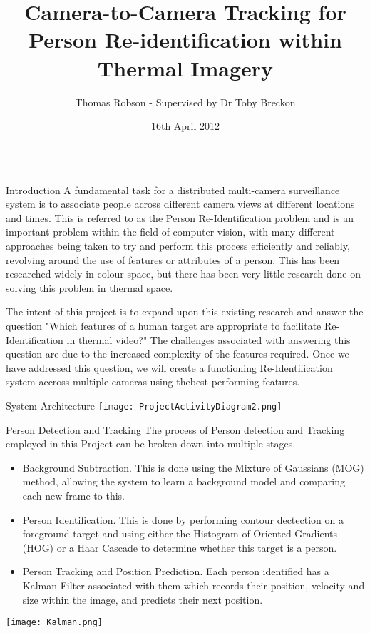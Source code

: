 \documentclass[final]{beamer}
\title[Thermal Re-ID]{Camera-to-Camera Tracking for Person Re-identification within Thermal Imagery}
\author[G Ingram]{Thomas Robson - Supervised by Dr Toby Breckon}
\institute[Durham]{School of Engineering and Computing Sciences, Durham University}
\date{16th April 2012}
\begin{document}
  \begin{frame}{} 

  \vfill
    \begin{columns}[t]
      \begin{column}{.48\linewidth}
        \begin{block}{Introduction}
          A fundamental task for a distributed multi-camera surveillance system is to associate people across different camera views at different locations and times. This is referred to as the Person Re-Identification problem and is an important problem within the field of computer vision, with many different approaches being taken to try and perform this process efficiently and reliably, revolving around the use of features or attributes of a person. This has been researched widely in colour space, but there has been very little research done on solving this problem in thermal space. 

The intent of this project is to expand upon this existing research and answer the question "Which features of a human target are appropriate to facilitate Re-Identification in thermal video?" The challenges associated with answering this question are due to the increased complexity of the features required. Once we have addressed this question, we will create a functioning Re-Identification system accross multiple cameras using thebest performing features.
        \end{block}

       

        \begin{block}{System Architecture}
          \texttt{[image: ProjectActivityDiagram2.png]}  
          \centering
        \end{block}
        
        \begin{block}{Person Detection and Tracking}
        	The process of Person detection and Tracking employed in this Project can be broken down into multiple stages. 
        	\begin{itemize}
        	\item Background Subtraction. This is done using the Mixture of Gaussians (MOG) method, allowing the system to learn a background model and comparing each new frame to this. 
        	\item Person Identification. This is done by performing contour dectection on a foreground target and using either the Histogram of Oriented Gradients (HOG) or a Haar Cascade to determine whether this target is a person.
        	\item Person Tracking and Position Prediction. Each person identified has a Kalman Filter associated with them which records their position, velocity and size within the image, and predicts their next position. 
        	\end{itemize}
          \texttt{[image: Kalman.png]}
          \centering  
        \end{block}
        

\end{column}
\end{columns}
\end{frame}
\end{document}
